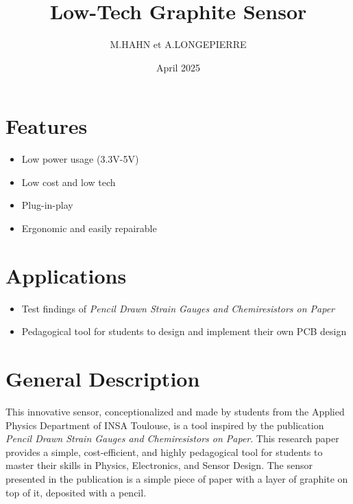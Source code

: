 \documentclass[10pt]{datasheet}
\title{Low-Tech Graphite Sensor}
\author{M.HAHN et A.LONGEPIERRE}
\date{April 2025}
\begin{document}
\maketitle


\section{Features}

\begin{itemize}
\item{Low power usage (3.3V-5V)}
\item{Low cost and low tech}
\item{Plug-in-play}
\item{Ergonomic and easily repairable}
\end{itemize}

\section{Applications}

\begin{itemize}
\item{Test findings of \it{Pencil Drawn Strain Gauges and Chemiresistors on Paper}\footnotemark{}}
\item{Pedagogical tool for students to design and implement their own PCB design}
\end{itemize}

\section{General Description}
This innovative sensor, conceptionalized and made by students from the Applied Physics Department of INSA Toulouse, is a tool inspired by the publication 
\textit{Pencil Drawn Strain Gauges and Chemiresistors on Paper}\footnotemark[\value{footnote}]. This research paper provides a simple, cost-efficient, and highly pedagogical tool for students 
to master their skills in Physics, Electronics, and Sensor Design. The sensor presented in the publication is a simple piece of paper with a layer of graphite 
on top of it, deposited with a pencil. 
\end{document}
